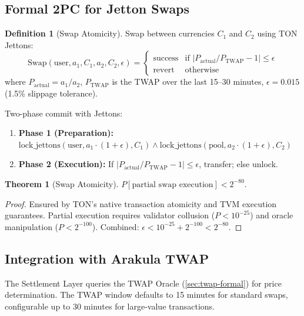 \documentclass[12pt,a4paper]{article}
\theoremstyle{definition}
\newtheorem{definition}{Definition}[section]
\newtheorem{theorem}{Theorem}[section]
\theoremstyle{remark}
\DeclareMathOperator{\TWAP}{TWAP}
\begin{document}
\subsection{Formal 2PC for Jetton Swaps}

\begin{definition}[Swap Atomicity]
Swap between currencies $C_1$ and $C_2$ using TON Jettons:
\begin{equation}
\text{Swap}(\text{user}, a_1, C_1, a_2, C_2, \epsilon) = \begin{cases}
\text{success} & \text{if } |P_{\text{actual}} / P_{\TWAP} - 1| \leq \epsilon \\
\text{revert} & \text{otherwise}
\end{cases}
\end{equation}
where $P_{\text{actual}} = a_1 / a_2$, $P_{\TWAP}$ is the TWAP over the last 15--30 minutes, $\epsilon = 0.015$ (1.5\% slippage tolerance).
\end{definition}

Two-phase commit with Jettons:
\begin{enumerate}[nosep]
    \item \textbf{Phase 1 (Preparation):} $\text{lock\_jettons}(\text{user}, a_1 \cdot (1+\epsilon), C_1) \wedge \text{lock\_jettons}(\text{pool}, a_2 \cdot (1+\epsilon), C_2)$
    \item \textbf{Phase 2 (Execution):} If $|P_{\text{actual}} / P_{\TWAP} - 1| \leq \epsilon$, transfer; else unlock.
\end{enumerate}

\begin{theorem}[Swap Atomicity]
\label{thm:swap-atomicity}
$P[\text{partial swap execution}] < 2^{-80}$.
\end{theorem}

\begin{proof}
Ensured by TON's native transaction atomicity and TVM execution guarantees. Partial execution requires validator collusion ($P < 10^{-25}$) and oracle manipulation ($P < 2^{-100}$). Combined: $\epsilon < 10^{-25} + 2^{-100} < 2^{-80}$.
\end{proof}

\subsection{Integration with Arakula TWAP}

The Settlement Layer queries the TWAP Oracle (\cref{sec:twap-formal}) for price determination. The TWAP window defaults to 15 minutes for standard swaps, configurable up to 30 minutes for large-value transactions.
\end{document}
